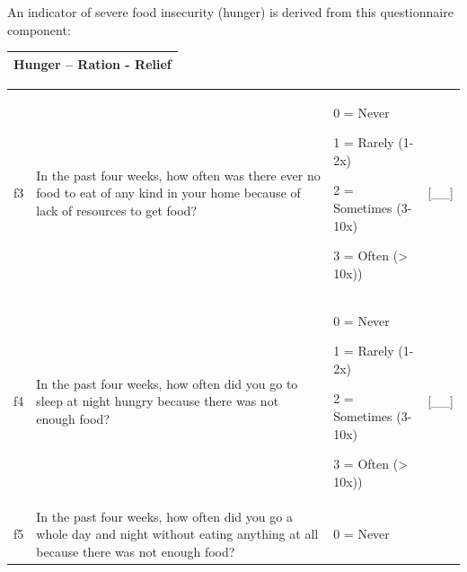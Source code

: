 \documentclass[12pt,a4paper]{book}
\theoremstyle{definition}
\theoremstyle{definition}
\theoremstyle{definition}
\theoremstyle{remark}
\begin{document}
An indicator of severe food insecurity (hunger) is derived from this
questionnaire component:

\begin{longtable}[]{@{}c@{}}
\toprule
\begin{minipage}[t]{0.97\columnwidth}\centering
\textbf{Hunger -- Ration - Relief}\strut
\end{minipage}\tabularnewline
\bottomrule
\end{longtable}

\begin{longtable}[]{@{}llll@{}}
\toprule
\begin{minipage}[t]{0.24\columnwidth}\raggedright
f3\strut
\end{minipage} & \begin{minipage}[t]{0.24\columnwidth}\raggedright
In the past four weeks, how often was there ever no food to eat of any
kind in your home because of lack of resources to get food?\strut
\end{minipage} & \begin{minipage}[t]{0.24\columnwidth}\raggedright
0 = Never

1 = Rarely (1-2x)

2 = Sometimes (3-10x)

3 = Often (\textgreater{} 10x))\strut
\end{minipage} & \begin{minipage}[t]{0.24\columnwidth}\raggedright
{[}\_\_{]}\strut
\end{minipage}\tabularnewline
\begin{minipage}[t]{0.24\columnwidth}\raggedright
f4\strut
\end{minipage} & \begin{minipage}[t]{0.24\columnwidth}\raggedright
In the past four weeks, how often did you go to sleep at night hungry
because there was not enough food?\strut
\end{minipage} & \begin{minipage}[t]{0.24\columnwidth}\raggedright
0 = Never

1 = Rarely (1-2x)

2 = Sometimes (3-10x)

3 = Often (\textgreater{} 10x))\strut
\end{minipage} & \begin{minipage}[t]{0.24\columnwidth}\raggedright
{[}\_\_{]}\strut
\end{minipage}\tabularnewline
\begin{minipage}[t]{0.24\columnwidth}\raggedright
f5\strut
\end{minipage} & \begin{minipage}[t]{0.24\columnwidth}\raggedright
In the past four weeks, how often did you go a whole day and night
without eating anything at all because there was not enough food?\strut
\end{minipage} & \begin{minipage}[t]{0.24\columnwidth}\raggedright
0 = Never


\end{minipage}
\end{longtable}
\end{document}
